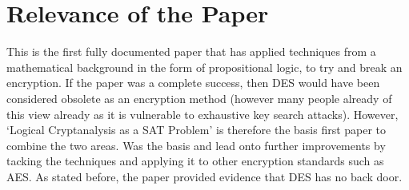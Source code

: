 \documentclass[11pt,a4paper, notitlepage]{report}
\begin{document}
\section{Relevance of the Paper}
\label{sec:RelOfPaper}
This is the first fully documented paper that has applied techniques from a mathematical background in the form of propositional logic, to try and break an encryption. If the paper was a complete success, then DES would have been considered obsolete as an encryption method (however many people already of this view already as it is vulnerable to exhaustive key search attacks). However, `Logical Cryptanalysis as a SAT Problem' \cite{Fabio2000LogicalSAT} is therefore the basis first paper to combine the two areas. Was the basis and lead onto further improvements by tacking the techniques and applying it to other encryption standards such as AES. As stated before, the paper provided evidence that DES has no back door. 
 
\end{document}
